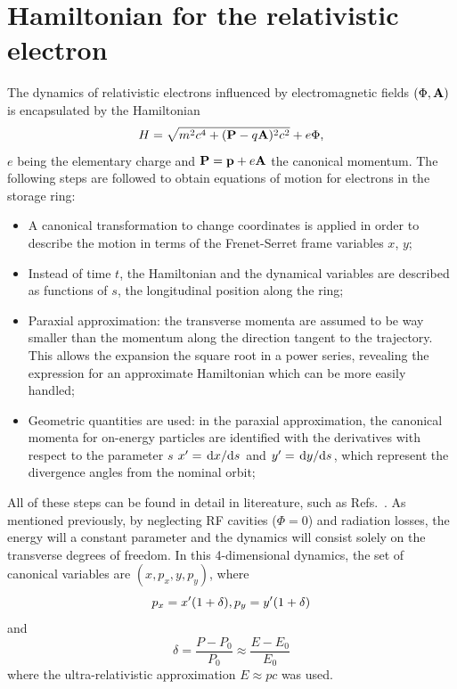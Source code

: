 \section{Hamiltonian for the relativistic electron}
The dynamics of relativistic electrons influenced by electromagnetic fields $(\Phi, \vb{A})$ is encapsulated by the Hamiltonian \cite{landau_classical_1975}
    \begin{equation*}
        H=\sqrt{m^2c^4+(\vb{P}-q\vb{A})^2c^2}+e\Phi,
    \end{equation*}
 $e$ being the elementary charge and $\vb{P}=\vb{p}+e\vb{A}$ the canonical momentum. The following steps are followed to obtain equations of motion for electrons in the storage ring:
 \begin{itemize}
    \item A canonical transformation to change coordinates is applied in order to describe the motion in terms of the Frenet-Serret frame variables $x$, $y$;
    \item Instead of time $t$, the Hamiltonian and the dynamical variables are described as functions of $s$, the longitudinal position along the ring;
    \item Paraxial approximation: the transverse momenta are assumed to be way smaller than the momentum along the direction tangent to the trajectory. This allows the expansion the square root in a power series, revealing the expression for an approximate Hamiltonian which can be more easily handled;
    \item Geometric quantities are used: in the paraxial approximation, the canonical momenta for on-energy particles are identified with the derivatives with respect to the parameter $s$ $x^\prime = \dv*{x}{s}$ and $y^\prime = \dv*{y}{s}$, which represent the divergence angles from the nominal orbit;
 \end{itemize}
 All of these steps can be found in detail in litereature, such as Refs.~\cite{lee_accelerator_2004, wiedemann_particle_2015,  wolski_beam_2014}. As mentioned previously, by neglecting RF cavities ($\Phi=0$) and radiation losses, the energy will a constant parameter and the dynamics will consist solely on the transverse degrees of freedom.  In this 4-dimensional dynamics, the set of canonical variables are $(x,p_{x},y , p_{y})$, where
\begin{equation} p_{x}= x^\prime(1+\delta),\\p_{y}=y^\prime (1+\delta)\end{equation}
and
\begin{equation}
    \delta = \frac{P-P_{0}}{P_{0}}\approx\frac{E-E_0}{E_0}
\end{equation}
where the ultra-relativistic approximation $E\approx pc$ was used.

